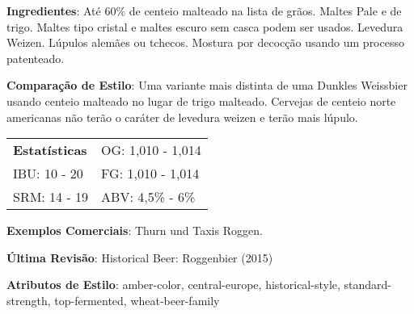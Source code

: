 \textbf{Ingredientes}: Até 60\% de centeio malteado na lista de grãos. Maltes Pale e de trigo. Maltes tipo cristal e maltes escuro sem casca podem ser usados. Levedura Weizen. Lúpulos alemães ou tchecos. Mostura por decocção usando um processo patenteado.

\textbf{Comparação de Estilo}: Uma variante mais distinta de uma Dunkles Weissbier usando centeio malteado no lugar de trigo malteado. Cervejas de centeio norte americanas não terão o caráter de levedura weizen e terão mais lúpulo.

\begin{tabular}{@{}p{35mm}p{35mm}@{}}
  \textbf{Estatísticas} & OG: 1,010 - 1,014  \\
  IBU: 10 - 20  & FG: 1,010 - 1,014  \\
  SRM: 14 - 19 & ABV: 4,5\% - 6\%
\end{tabular}

\textbf{Exemplos Comerciais}: Thurn und Taxis Roggen.

\textbf{Última Revisão}: Historical Beer: Roggenbier (2015)

\textbf{Atributos de Estilo}: amber-color, central-europe, historical-style, standard-strength, top-fermented, wheat-beer-family
